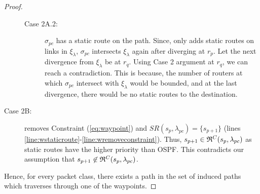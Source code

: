 \begin{proof}
\begin{description}
\begin{description}
			\item[Case 2A.2:]
			$\sigma_{pc}$ has a static route on the path. Since, 
			only adds static routes on links in $\xi_\lambda$, $\sigma_{pc}$ intersects $\xi_\lambda$
			again after diverging at $r_{p}$. Let the next divergence from $\xi_\lambda$ be at $r_{q}$.
			Using Case 2 argument at $r_{q}$, we can reach a contradiction. This is because, the number
			of routers at which $\sigma_{pc}$ intersect with $\xi_\lambda$ would be bounded, and at the last
			divergence, there would be no static routes to the destination.
		 
\end{description}
	\item[Case 2B:]
	 removes Constraint (\ref{eq:waypoint}) 
	and $SR(s_p, \lambda_{pc}) = \{s_{p+1}\}$ (lines \ref{line:wstaticroute}-\ref{line:wremoveconstraint}). 
	Thus, $s_{p+1} \in \mathfrak{R}^C(s_{p}, \lambda_{pc})$ as static routes 
	have the higher priority than OSPF. This contradicts our assumption
	that $s_{p+1} \not\in \mathfrak{R}^C(s_{p}, \lambda_{pc})$. 
	\end{description}
	
	Hence, for every packet class, 
	there exists a path in the set of induced paths which traverses through one of the waypoints. 
	\end{proof}
